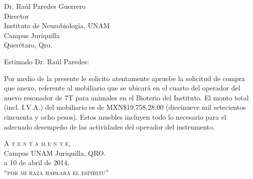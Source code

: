 \documentclass[final,letter,10pt]{letter}
\date{}  %
\begin{document}
  \setlength{\wpYoffset}{-10pt}
\pagestyle{empty}
\begin{letter}{
    Dr. Raúl Paredes Guerrero \\
    Director \\
    Instituto de Neurobiolog\'{\i}a, UNAM \\  %
    Campus Juriquilla                     \\  %
    Querétaro, Qro.                   %
}


\opening{Estimado Dr. Raúl Paredes:}


Por medio de la presente le solicito atentamente apruebe la solicitud de compra que anexo, referente al mobiliario que se ubicará en el cuarto del operador del nuevo resonador de 7T para animales en el Bioterio del Instituto. El monto total (incl. I.V.A.) del mobiliario es de MXN\$19,758.28.00 (diecinueve mil setecientos cincuenta y ocho pesos). Estos muebles incluyen todo lo necesario para el adecuado desempeño de las actividades del operador del instrumento. 



\begin{flushright}
  \closing{\textsc{A t e n t a m e n t e},\\
  Campus UNAM Juriquilla, QRO. \\
  a 10 de abril de 2014,\\
  \textsc{``por mi raza hablará el espíritu''}
}
\end{flushright}






\end{letter}
\end{document}
